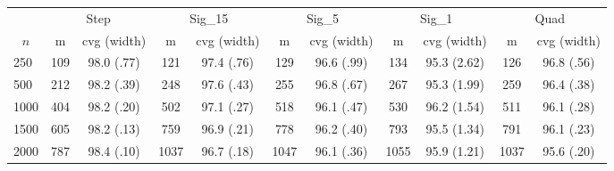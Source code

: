 \documentclass{article}
\begin{document}
\begin{tabular}{lcccccccccc}
   \toprule
 
           & \multicolumn{2}{c}{Step}& \multicolumn{2}{c}{Sig\_15}& \multicolumn{2}{c}{Sig\_5}& \multicolumn{2}{c}{Sig\_1}& \multicolumn{2}{c}{Quad} \\ 
             \cmidrule(l{2pt}r{2pt}){2-3} \cmidrule(l{2pt}r{2pt}){4-5} \cmidrule(l{2pt}r{2pt}){6-7} \cmidrule(l{2pt}r{2pt}){8-9}  \cmidrule(l{2pt}r{2pt}){10-11} 
             \multicolumn{1}{c}{$n$} & \multicolumn{1}{c}{m}& \multicolumn{1}{c}{cvg (width)}& \multicolumn{1}{c}{m}& \multicolumn{1}{c}{cvg (width)}& \multicolumn{1}{c}{m}& \multicolumn{1}{c}{cvg (width)}& \multicolumn{1}{c}{m}& \multicolumn{1}{c}{cvg (width)}& \multicolumn{1}{c}{m}& \multicolumn{1}{c}{cvg (width)} \\ \midrule 
        250 & 109 & 98.0 (.77) & 121 & 97.4 (.76) & 129 & 96.6 (.99) & 134 & 95.3 (2.62) & 126 & 96.8 (.56) \\ 
  500 & 212 & 98.2 (.39) & 248 & 97.6 (.43) & 255 & 96.8 (.67) & 267 & 95.3 (1.99) & 259 & 96.4 (.38) \\ 
  1000 & 404 & 98.2 (.20) & 502 & 97.1 (.27) & 518 & 96.1 (.47) & 530 & 96.2 (1.54) & 511 & 96.1 (.28) \\ 
  1500 & 605 & 98.2 (.13) & 759 & 96.9 (.21) & 778 & 96.2 (.40) & 793 & 95.5 (1.34) & 791 & 96.1 (.23) \\ 
  2000 & 787 & 98.4 (.10) & 1037 & 96.7 (.18) & 1047 & 96.1 (.36) & 1055 & 95.9 (1.21) & 1037 & 95.6 (.20) \\ 
   \hline
\end{tabular}
\end{document}
